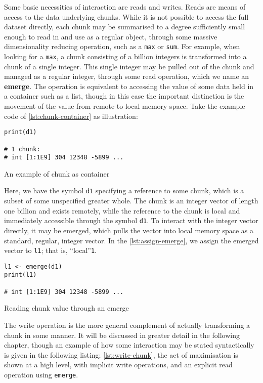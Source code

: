 Some basic necessities of interaction are reads and writes. Reads are
means of access to the data underlying chunks. While it is not possible
to access the full dataset directly, each chunk may be summarised to a
degree sufficiently small enough to read in and use as a regular object,
through some massive dimensionality reducing operation, such as a
\texttt{max} or \texttt{sum}. For example, when looking for a
\texttt{max}, a chunk consisting of a billion integers is transformed
into a chunk of a single integer. This single integer may be pulled out
of the chunk and managed as a regular integer, through some read
operation, which we name an \textbf{emerge}. The operation is equivalent
to accessing the value of some data held in a container such as a list,
though in this case the important distinction is the movement of the
value from remote to local memory space. Take the example code of \ref{lst:chunk-container}
as illustration:

\begin{listing}
    \begin{verbatim}
print(d1)

# 1 chunk:
# int [1:1E9] 304 12348 -5899 ...
    \end{verbatim}
    \caption{An example of chunk as container}
    \label{lst:chunk-container}
\end{listing}

Here, we have the symbol \texttt{d1} specifying a reference to some
chunk, which is a subset of some unspecified greater whole. The chunk is
an integer vector of length one billion and exists remotely, while the
reference to the chunk is local and immediately accessible through the
symbol \texttt{d1}. To interact with the integer vector directly, it may
be emerged, which pulls the vector into local memory space as a
standard, regular, integer vector. In the \ref{lst:assign-emerge}, we assign
the emerged vector to \texttt{l1}; that is, ``local''\texttt{1}.

\begin{listing}
    \begin{verbatim}
l1 <- emerge(d1)
print(l1)

# int [1:1E9] 304 12348 -5899 ...
    \end{verbatim}
    \caption{Reading chunk value through an emerge}
    \label{lst:assign-emerge}
\end{listing}

The write operation is the more general complement of actually
transforming a chunk in some manner. It will be discussed in greater
detail in the following chapter, though an example of how some
interaction may be stated syntactically is given in the following
listing; \ref{lst:write-chunk}, the act of maximisation is shown at a high level, with
implicit write operations, and an explicit read operation using
\texttt{emerge}.

